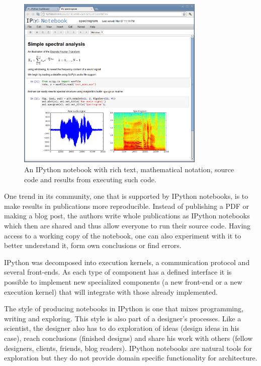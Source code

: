\documentclass{./llncs2e/llncs}
\begin{document}
	\begin{figure}
		\centering
		\includegraphics[width=0.8\textwidth]{img/ipython_notebook}
		\caption{An IPython notebook with rich text, mathematical notation, source code and results from executing such code.}
		\label{fig:ipython:notebook}
	\end{figure}
	
	One trend in its community, one that is supported by IPython notebooks, is to make results in publications more reproducible. 
	Instead of publishing a PDF or making a blog post, the authors write whole publications as IPython notebooks which then are shared and thus allow everyone to run their source code. 
	Having access to a working copy of the notebook, one can also experiment with it to better understand it, form own conclusions or find errors.
	
	IPython was decomposed into execution kernels, a communication protocol and several front-ends. 
	As each type of component has a defined interface it is possible to implement new specialized components (a new front-end or a new execution kernel) that will integrate with those already implemented.
	
	The style of producing notebooks in IPython is one that mixes programming, writing and exploring. 
	This style is also part of a designer's processes. 
	Like a scientist, the designer also has to do exploration of ideas (design ideas in his case), reach conclusions (finished designs) and share his work with others (fellow designers, clients, friends, blog readers). 
	IPython notebooks are natural tools for exploration but they do not provide domain specific functionality for architecture.
	
\end{document}
